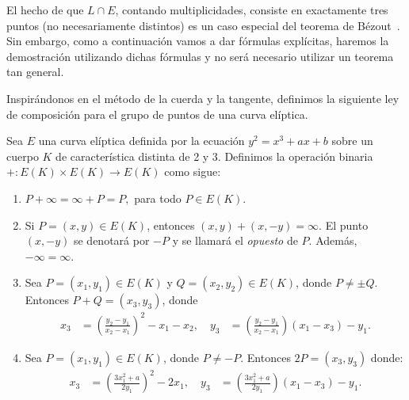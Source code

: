 \begin{nota}
El hecho de que $L \cap E$, contando multiplicidades, consiste en exactamente tres puntos (no necesariamente distintos) es un caso especial del teorema de Bézout~\cite[sec. I.7.8]{Hartshorne:1977}. Sin embargo, como a continuación vamos a dar fórmulas explícitas, haremos la demostración utilizando dichas fórmulas y no será necesario utilizar un teorema tan general.
\end{nota}

Inspirándonos en el método de la cuerda y la tangente, definimos la siguiente ley de composición para el grupo de puntos de una curva elíptica.

\begin{definicion}
\label{def:ley de grupo}
Sea $E$ una curva elíptica definida por la ecuación $y^2 = x^3 + a x + b$ sobre un cuerpo $K$ de característica distinta de 2 y 3. Definimos la operación binaria $+: E(K) \times E(K) \to E(K)$ como sigue:
\begin{enumerate}
	\item $P + \infty = \infty + P = P,$ para todo $P \in E(K)$.

	\item Si $P = (x, y) \in E(K)$, entonces $(x, y) + (x, -y) = \infty$. El punto $(x, -y)$ se denotará por $-P$ y se llamará el \emph{opuesto} de $P$. Además, $- \infty = \infty$.

	\item Sea $P = (x_1, y_1) \in E(K)$ y $Q = (x_2, y_2) \in E(K)$, donde $P \neq \pm Q$. Entonces $P + Q = (x_3, y_3)$, donde
	\begin{align*}
x_3 &= \left(\frac{y_2 - y_1}{x_2 - x_1}\right)^2 - x_1 - x_2, \quad y_3 &= \left(\frac{y_2 - y_1}{x_2 - x_1}\right) (x_1 - x_3) - y_1.
	\end{align*}

	\item Sea $P = (x_1, y_1) \in E(K)$, donde $P \neq  -P$. Entonces $2 P = (x_3, y_3)$ donde:
	\begin{align*}
x_3 &= \left(\frac{3 x_1^2 + a}{2 y_1}\right)^2 - 2 x_1, \quad y_3 &= \left(\frac{3 x_1^2 + a}{2 y_1}\right) (x_1 - x_3) - y_1.
	\end{align*}
\end{enumerate}
\end{definicion}
